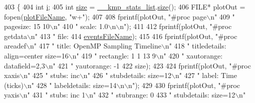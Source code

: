 \begin{DoxyCode}
403                                                 \{
404     \textcolor{keywordtype}{int} \hyperlink{kmp__stub_8c_a08582ce460e3d5e1cf0b7fea017d608e}{i};
405     \textcolor{keywordtype}{int} \hyperlink{ittnotify__static_8h_a5a1daa0c1d342747e3884fa54fc64fb1}{size} = \hyperlink{kmp__global_8c_a4ce412fd3335747984f4b5d8fa62cb98}{\_\_kmp\_stats\_list}.\hyperlink{classkmp__stats__list_a2e7b8c47d79298daa179a368132af8af}{size}();
406     FILE* plotOut = fopen(\hyperlink{classkmp__stats__output__module_ab28d6e78e962dd887f82a6733d82b0ab}{plotFileName}, \textcolor{stringliteral}{"w+"});
407 
408     fprintf(plotOut, \textcolor{stringliteral}{"#proc page\(\backslash\)n"}
409                      \textcolor{stringliteral}{"   pagesize: 15 10\(\backslash\)n"}
410                      \textcolor{stringliteral}{"   scale: 1.0\(\backslash\)n\(\backslash\)n"});
411 
412     fprintf(plotOut, \textcolor{stringliteral}{"#proc getdata\(\backslash\)n"}
413                      \textcolor{stringliteral}{"   file: %
414                      \hyperlink{classkmp__stats__output__module_abeb05f889265a698f6d82f1a66f0ea6d}{eventsFileName});
415 
416     fprintf(plotOut, \textcolor{stringliteral}{"#proc areadef\(\backslash\)n"}
417                      \textcolor{stringliteral}{"   title: OpenMP Sampling Timeline\(\backslash\)n"}
418                      \textcolor{stringliteral}{"   titledetails: align=center size=16\(\backslash\)n"}
419                      \textcolor{stringliteral}{"   rectangle: 1 1 13 9\(\backslash\)n"}
420                      \textcolor{stringliteral}{"   xautorange: datafield=2,3\(\backslash\)n"}
421                      \textcolor{stringliteral}{"   yautorange: -1 %
422                      size);
423 
424     fprintf(plotOut, \textcolor{stringliteral}{"#proc xaxis\(\backslash\)n"}
425                      \textcolor{stringliteral}{"   stubs: inc\(\backslash\)n"}
426                      \textcolor{stringliteral}{"   stubdetails: size=12\(\backslash\)n"}
427                      \textcolor{stringliteral}{"   label: Time (ticks)\(\backslash\)n"}
428                      \textcolor{stringliteral}{"   labeldetails: size=14\(\backslash\)n\(\backslash\)n"});
429 
430     fprintf(plotOut, \textcolor{stringliteral}{"#proc yaxis\(\backslash\)n"}
431                      \textcolor{stringliteral}{"   stubs: inc 1\(\backslash\)n"}
432                      \textcolor{stringliteral}{"   stubrange: 0 %
433                      \textcolor{stringliteral}{"   stubdetails: size=12\(\backslash\)n"}
}}}
\end{DoxyCode}
